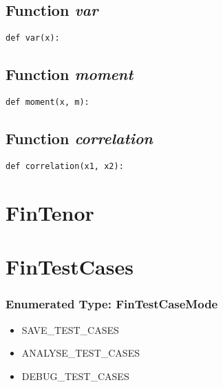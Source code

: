 \documentclass[twoside,11pt]{book}
\begin{document}
\subsection{Function {\it var}}


\begin{lstlisting}
def var(x):
\end{lstlisting}

\subsection{Function {\it moment}}


\begin{lstlisting}
def moment(x, m):
\end{lstlisting}

\subsection{Function {\it correlation}}


\begin{lstlisting}
def correlation(x1, x2):
\end{lstlisting}

\newpage
\section{FinTenor}

\newpage
\section{FinTestCases}

\subsubsection{Enumerated Type: FinTestCaseMode}
\begin{itemize}
\item{SAVE\_TEST\_CASES}
\item{ANALYSE\_TEST\_CASES}
\item{DEBUG\_TEST\_CASES}
\end{itemize}
\end{document}
